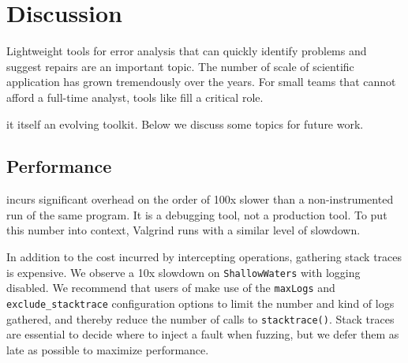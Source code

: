 \documentclass{juliacon}
\begin{document}



\section{Discussion}
\label{s:discussion}

Lightweight tools for error analysis that can quickly identify
\fp{} problems and suggest repairs are an important topic.
The number of scale of scientific application has grown tremendously
over the years.
For small teams that cannot afford a full-time
analyst, tools like \FlowFPX{} fill a critical role.

\FlowFPX{} it itself an evolving toolkit.
Below we discuss some topics for future work.


\subsection{Performance}
\label{s:discussion-performance}

\FT{} incurs significant overhead on the order of 100x slower than a non-instrumented run of the same program.
It is a debugging tool, not a production tool.
To put this number into context, Valgrind runs with a similar level of slowdown.

In addition to the cost incurred by intercepting \fp{} operations, gathering stack traces is expensive.
We observe a 10x slowdown on \texttt{ShallowWaters} with logging disabled.
We recommend that users of \FT{} make use of the \texttt{maxLogs} and \texttt{exclude\_stacktrace} configuration options to limit the number and kind of logs gathered, and thereby reduce the number of calls to \texttt{stacktrace()}.
Stack traces are essential to decide where to inject a fault when fuzzing,
but we defer them as late as possible to maximize performance.
\end{document}
